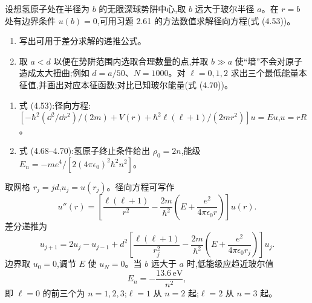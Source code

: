\begin{question}
设想氢原子处在半径为 $b$ 的无限深球势阱中心,取 $b$ 远大于玻尔半径 $a$。在 $r=b$ 处有边界条件 $u(b)=0$,可用习题 2.61 的方法数值求解径向方程(式 (4.53))。
\begin{enumerate}
\item 写出可用于差分求解的递推公式。
\item 取 $a<d$ 以便在势阱范围内选取合理数量的点,并取 $b\gg a$ 使“墙”不会对原子造成太大扭曲;例如 $d=a/50$、$N=1000$。对 $\ell=0,1,2$ 求出三个最低能量本征值,并画出对应本征函数;对比已知玻尔能量(式 (4.70))。
\end{enumerate}

\par\smallskip
{}
\begin{enumerate}[leftmargin=2.2em,itemsep=0.12em,topsep=0.12em,parsep=0pt]
\item 式 (4.53):径向方程:$[-\hbar^2(\dd^2/\dd r^2)/(2m)+V(r)+\hbar^2\ell(\ell+1)/(2mr^2)]u=Eu$,$u=rR$。
\item 式 (4.68--4.70):氢原子终止条件给出 $\rho_0=2n$,能级 $E_n=-me^4/[2(4\pi\epsilon_0)^2\hbar^2n^2]$。
\end{enumerate}

\begin{solution}

取网格 $r_j=jd$,$u_j=u(r_j)$。径向方程可写作
\[
u''(r)=\left[\frac{\ell(\ell+1)}{r^2}-\frac{2m}{\hbar^2}\left(E+\frac{e^2}{4\pi\epsilon_0r}\right)\right]u(r).
\]
差分递推为
\[
u_{j+1}=2u_j-u_{j-1}+d^2\left[\frac{\ell(\ell+1)}{r_j^2}-\frac{2m}{\hbar^2}\left(E+\frac{e^2}{4\pi\epsilon_0r_j}\right)\right]u_j.
\]
边界取 $u_0=0$,调节 $E$ 使 $u_N=0$。当 $b$ 远大于 $a$ 时,低能级应趋近玻尔值
\[
E_n=-\frac{13.6\,\mathrm{eV}}{n^2},
\]
即 $\ell=0$ 的前三个为 $n=1,2,3$;$\ell=1$ 从 $n=2$ 起;$\ell=2$ 从 $n=3$ 起。

\end{solution}
\end{question}

